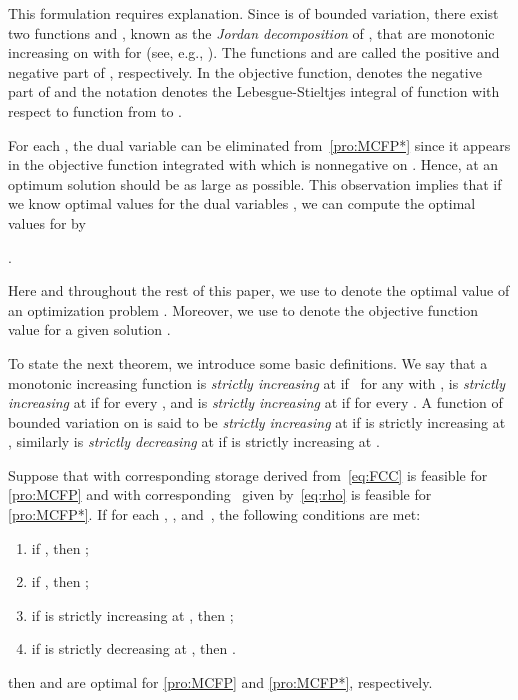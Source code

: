 \documentclass{svjour3}                     \smartqed
\begin{document}
This formulation requires explanation. Since  is of
bounded variation, there exist two functions  and , known as the \emph{Jordan decomposition} of , that are monotonic increasing on  with  for  (see, e.g., \cite[Chapter 6 ]{Apostol74}). The functions  and  are called the positive and negative part of , respectively. In the objective function,  denotes the negative part of  and the notation  denotes the Lebesgue-Stieltjes integral of function  with respect to function  from  to .

For each , the dual variable  can be eliminated from~\eqref{pro:MCFP*} since it appears in the objective function integrated with  which is nonnegative on . Hence, at an optimum solution  should be as large as possible. This observation implies that if we know optimal values for the dual variables , we can compute the optimal values for  by



\begin{theorem}
\label{thm:WeakDuality} .
\end{theorem}
Here and throughout the rest of this paper, we use   to denote the optimal value of an optimization problem . Moreover, we use  to denote the objective function value for a given solution . 

To state the next theorem, we introduce some basic definitions. We say that a monotonic increasing function  is \emph{strictly increasing} at  if~ for any  with ,  is \emph{strictly increasing} at  if  for every , and  is \emph{strictly increasing} at  if  for every . A function  of bounded variation on  is said to be \emph{strictly increasing} at  if  is strictly increasing at , similarly  is \emph{strictly decreasing} at  if  is strictly increasing at .


\begin{theorem}
\label{thm:CS} Suppose that   with corresponding
storage  derived from~\eqref{eq:FCC} is feasible for \eqref{pro:MCFP} and  with
corresponding~ given by~\eqref{eq:rho} is feasible for \eqref{pro:MCFP*}. If for each , , and~, the following conditions are met:
\begin{enumerate}[label = (CS\arabic*), leftmargin = *]
  \item\label{it:CS1} if , then
  ;
  \item\label{it:CS2} if , then ;
  \item\label{it:CS3} if  is strictly increasing at , then
  ;
  \item\label{it:CS4} if  is strictly decreasing at , then
  .
\end{enumerate}
then  and  are optimal for \eqref{pro:MCFP} and \eqref{pro:MCFP*}, respectively.
\end{theorem}
\end{document}
